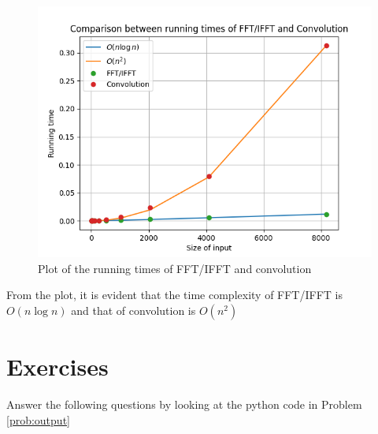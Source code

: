 \documentclass[journal,12pt,twocolumn]{IEEEtran}
\numberwithin{equation}{section}
\renewcommand\thesection{\arabic{section}}
\begin{document}
\begin{enumerate}[label=\thesection.\arabic*]
	\begin{figure}[!ht]
		\centering
		\includegraphics[width=\columnwidth]{./figs/7.14.png}
		\caption{Plot of the running times of FFT/IFFT and convolution}
		\label{fig-7.14}	
	\end{figure}
	
	From the plot, it is evident that the time complexity of FFT/IFFT is $O(n \log n)$ and that of convolution is $O(n^2)$
	
	
	\end{enumerate}
	
	\section{Exercises}
	Answer the following questions by looking at the python code in Problem \ref{prob:output}
	
\end{document}
